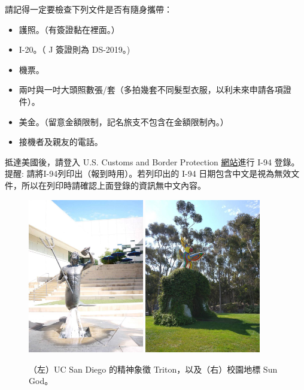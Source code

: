 \documentclass[10pt,a4paper]{book}
\begin{document}
\begin{CJK}{UTF8}{bkai}
請記得一定要檢查下列文件是否有隨身攜帶：
\begin{itemize}
\item 護照。（有簽證黏在裡面。）
\item I-20。（ J 簽證則為 DS-2019。)
\item 機票。
\item 兩吋與一吋大頭照數張/套（多拍幾套不同髮型衣服，以利未來申請各項證件）。
\item 美金。（留意金額限制，記名旅支不包含在金額限制內。）
\item 接機者及親友的電話。
\end{itemize}

抵達美國後，請登入 U.S. Customs and Border Protection \href{https://i94.cbp.dhs.gov/I94/#/home}{網站}進行 I-94 登錄。
提醒: 請將I-94列印出（報到時用）。若列印出的 I-94 日期包含中文是視為無效文件，所以在列印時請確認上面登錄的資訊無中文內容。

\begin{figure}[b]
\centering
\includegraphics[width=0.45\textwidth]{Pics/tritonstatue}
\includegraphics[width=0.45\textwidth]{Pics/sungod}
\caption{（左）UC San Diego 的精神象徵 Triton，以及（右）校園地標 Sun God。}
\end{figure}



\end{CJK}
\end{document}
